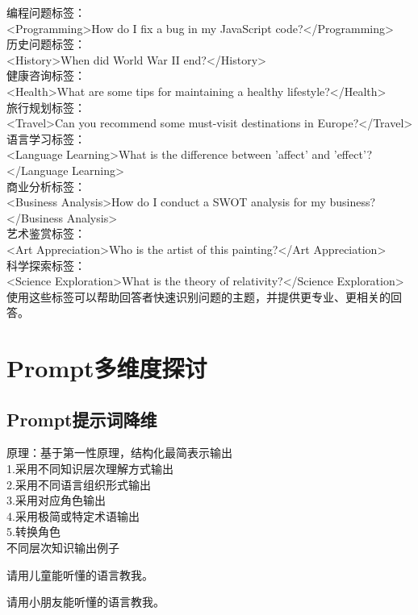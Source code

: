 \documentclass[12pt]{book}
\begin{document}
编程问题标签：\\
<Programming>How do I fix a bug in my JavaScript code?</Programming>\\
历史问题标签：\\
<History>When did World War II end?</History>\\
健康咨询标签：\\
<Health>What are some tips for maintaining a healthy lifestyle?</Health>\\
旅行规划标签：\\
<Travel>Can you recommend some must-visit destinations in Europe?</Travel>\\
语言学习标签：\\
<Language Learning>What is the difference between 'affect' and 'effect'?</Language Learning>\\
商业分析标签：\\
<Business Analysis>How do I conduct a SWOT analysis for my business?</Business Analysis>\\
艺术鉴赏标签：\\
<Art Appreciation>Who is the artist of this painting?</Art Appreciation>\\
科学探索标签：\\
<Science Exploration>What is the theory of relativity?</Science Exploration>\\
使用这些标签可以帮助回答者快速识别问题的主题，并提供更专业、更相关的回答。\\

\chapter{Prompt多维度探讨}
 \section{Prompt提示词降维}		
	原理：基于第一性原理，结构化最简表示输出\\
	1.采用不同知识层次理解方式输出\\
	2.采用不同语言组织形式输出\\
	3.采用对应角色输出\\
	4.采用极简或特定术语输出\\
	5.转换角色\\


不同层次知识输出例子
	\begin{tcolorbox}
请用儿童能听懂的语言教我。
	\end{tcolorbox}
	
	\begin{tcolorbox}
请用小朋友能听懂的语言教我。
\end{tcolorbox}
 
\end{document}

